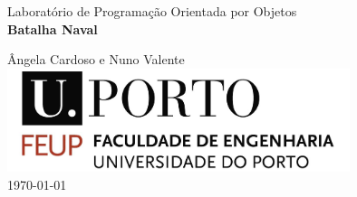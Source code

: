 

\begin{titlepage}
\begin{center}
 
\vspace*{3cm}

{\Large Laboratório de Programação Orientada por Objetos}\\[2cm]

{\Huge \bfseries Batalha Naval \\[1cm]}

{\large Ângela Cardoso e Nuno Valente}\\[2cm]

\includegraphics[width=10cm]{feup_logo.jpg}\\[2cm]


{\large \today}

\end{center}
\end{titlepage}